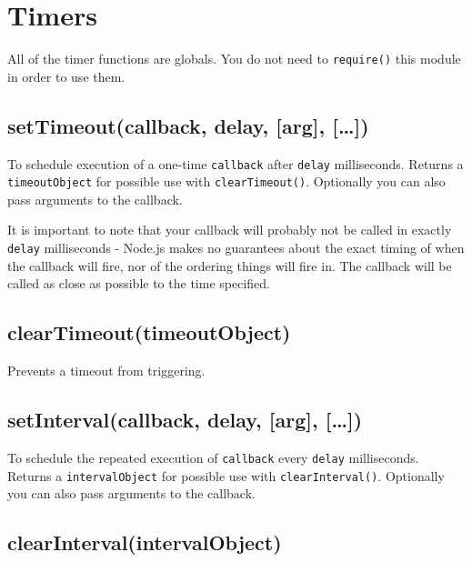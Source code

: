 \section{Timers}\label{timers}

\begin{Shaded}
\begin{Highlighting}[]
 
\end{Highlighting}
\end{Shaded}

All of the timer functions are globals. You do not need to
\texttt{require()} this module in order to use them.

\subsection{setTimeout(callback, delay, {[}arg{]},
{[}\ldots{}{]})}\label{settimeoutcallback-delay-arg}

To schedule execution of a one-time \texttt{callback} after
\texttt{delay} milliseconds. Returns a \texttt{timeoutObject} for
possible use with \texttt{clearTimeout()}. Optionally you can also pass
arguments to the callback.

It is important to note that your callback will probably not be called
in exactly \texttt{delay} milliseconds - Node.js makes no guarantees
about the exact timing of when the callback will fire, nor of the
ordering things will fire in. The callback will be called as close as
possible to the time specified.

\subsection{clearTimeout(timeoutObject)}\label{cleartimeouttimeoutobject}

Prevents a timeout from triggering.

\subsection{setInterval(callback, delay, {[}arg{]},
{[}\ldots{}{]})}\label{setintervalcallback-delay-arg}

To schedule the repeated execution of \texttt{callback} every
\texttt{delay} milliseconds. Returns a \texttt{intervalObject} for
possible use with \texttt{clearInterval()}. Optionally you can also pass
arguments to the callback.

\subsection{clearInterval(intervalObject)}\label{clearintervalintervalobject}

